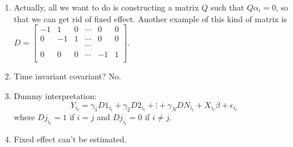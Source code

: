 \documentclass[11pt]{elegantbook}
\begin{document}
\begin{remark}
    \begin{enumerate}
        \item Actually, all we want to do is constructing a matrix $Q$ such that $Q\alpha_i=0$, so that we can get rid of fixed effect. Another example of this kind of matrix is $D=\begin{bmatrix}
            -1&1&0&\cdots&0&0\\
            0&-1&1&\cdots&0&0\\
            &&&\cdots&&\\
            0&0&0&\cdots&-1&1\\
        \end{bmatrix}$.
    \item Time invariant covariant? No.
    \item Dummy interpretation: $$Y_{i_t}=\gamma_1 D1_{i_t}+\gamma_2 D2_{i_t}+\vdots+ \gamma_N DN_{i_t}+ X_{i_t}\beta+\epsilon_{i_t}$$
    where $Dj_{i_t}=1$ if $i=j$ and $Dj_{i_t}=0$ if $i\neq j$.
    \item Fixed effect can't be estimated.
    \end{enumerate}
\end{remark}
\end{document}
